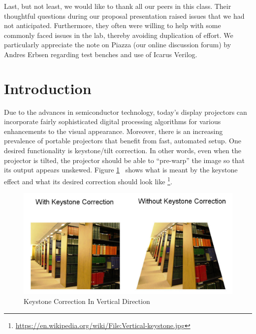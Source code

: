 \documentclass{article}
\begin{document}
Last, but not least, we would like to thank all our peers in this class.
Their thoughtful questions during our proposal presentation raised issues that we had not anticipated.
Furthermore, they often were willing to help with some commonly faced issues in the lab, thereby avoiding duplication of effort.
We particularly appreciate the note on Piazza (our online discussion forum) by Andres Erbsen regarding test benches and use of Icarus Verilog.
\newpage

\tableofcontents
\newpage

\section{Introduction}
Due to the advances in semiconductor technology,
today's display projectors can incorporate fairly sophisticated digital processing algorithms for various enhancements to the visual appearance.
Moreover, there is an increasing prevalence of portable projectors that benefit from fast, automated setup.
One desired functionality is keystone/tilt correction.
In other words, even when the projector is tilted, the projector should be able to ``pre-warp'' the image so that its output appears unskewed.
Figure \ref{fig:vert_keystone}~ shows what is meant by the keystone effect and what its desired correction should look like
\footnote{\url{https://en.wikipedia.org/wiki/File:Vertical-keystone.jpg}}.
\begin{center}
\begin{figure}[H]
\label{fig:vert_keystone}
\caption{Keystone Correction In Vertical Direction}
\centering
\includegraphics[width=\textwidth]{./img/keystone}
\end{figure}
\end{center}
\end{document}
